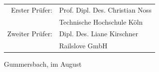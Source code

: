 \begin{titlepage}
\begin{center}
\vspace{1.6cm}

\begin{tabular}{rl}
        Erster Prüfer:  &  Prof. Dipl. Des. Christian Noss\\
       					&  \small Technische Hochschule Köln \\[1.0em]
       Zweiter Prüfer:  &  Dipl. Des. Liane Kirschner\\
       					&  \small Railslove GmbH\\
\end{tabular}

\vspace{1.6cm}

\begin{large}
Gummersbach, im August \the\year
\end{large}

\end{center}

\end{titlepage}
